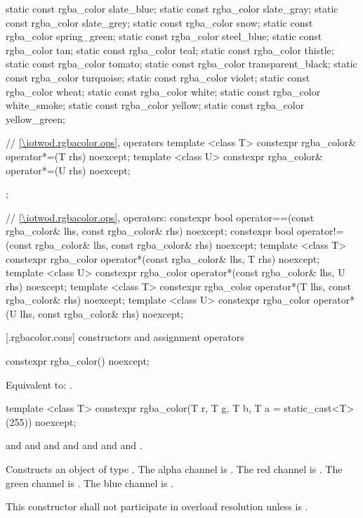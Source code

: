 \begin{codeblock}
{{    static const rgba_color slate_blue;
    static const rgba_color slate_gray;
    static const rgba_color slate_grey;
    static const rgba_color snow;
    static const rgba_color spring_green;
    static const rgba_color steel_blue;
    static const rgba_color tan;
    static const rgba_color teal;
    static const rgba_color thistle;
    static const rgba_color tomato;
    static const rgba_color transparent_black;
    static const rgba_color turquoise;
    static const rgba_color violet;
    static const rgba_color wheat;
    static const rgba_color white;
    static const rgba_color white_smoke;
    static const rgba_color yellow;
    static const rgba_color yellow_green;
    
    // \ref{\iotwod.rgbacolor.ops}, operators
    template <class T>
    constexpr rgba_color& operator*=(T rhs) noexcept;
    template <class U>
    constexpr rgba_color& operator*=(U rhs) noexcept;
  };

  // \ref{\iotwod.rgbacolor.ops}, operators:
  constexpr bool operator==(const rgba_color& lhs, const rgba_color& rhs) 
    noexcept;
  constexpr bool operator!=(const rgba_color& lhs, const rgba_color& rhs) 
    noexcept;
  template <class T>
  constexpr rgba_color operator*(const rgba_color& lhs, T rhs) noexcept;
  template <class U>
  constexpr rgba_color operator*(const rgba_color& lhs, U rhs) noexcept;
  template <class T>
  constexpr rgba_color operator*(T lhs, const rgba_color& rhs) noexcept;
  template <class U>
  constexpr rgba_color operator*(U lhs, const rgba_color& rhs) noexcept;
}
\end{codeblock}

 [\iotwod.rgbacolor.cons] { constructors and assignment operators}

%
\begin{itemdecl}
constexpr rgba_color() noexcept;
\end{itemdecl}
\begin{itemdescr}
\pnum
\effects
Equivalent to: .
\end{itemdescr}

%
\begin{itemdecl}
template <class T>
constexpr rgba_color(T r, T g, T b, T a = static_cast<T>(255)) noexcept;
\end{itemdecl}
\begin{itemdescr}
\pnum
\requires
{} and  and  and  and  and  and  and .

\pnum
\effects
Constructs an object of type . The alpha channel is . The red channel is . The green channel is . The blue channel is .

\pnum
\remarks
This constructor shall not participate in overload resolution unless  is .
\end{itemdescr}

